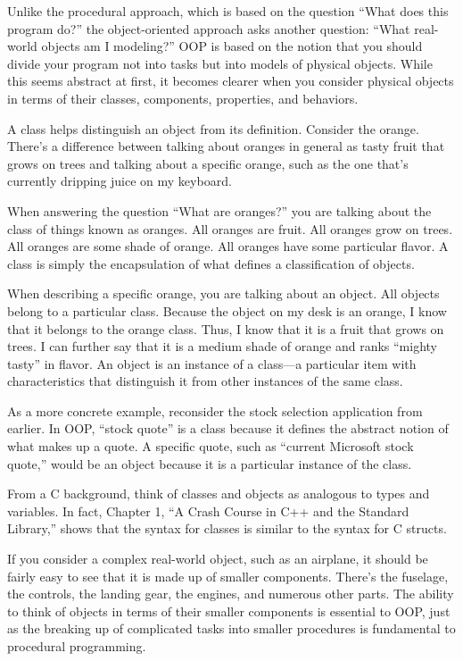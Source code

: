 
Unlike the procedural approach, which is based on the question “What does this program do?” the object-oriented approach asks another question: “What real-world objects am I modeling?” OOP is based on the notion that you should divide your program not into tasks but into models of physical objects. While this seems abstract at first, it becomes clearer when you consider physical objects in terms of their classes, components, properties, and behaviors.


A class helps distinguish an object from its definition. Consider the orange. There’s a difference between talking about oranges in general as tasty fruit that grows on trees and talking about a specific orange, such as the one that’s currently dripping juice on my keyboard.

When answering the question “What are oranges?” you are talking about the class of things known as oranges. All oranges are fruit. All oranges grow on trees. All oranges are some shade of orange. All oranges have some particular flavor. A class is simply the encapsulation of what defines a classification of objects.

When describing a specific orange, you are talking about an object. All objects belong to a particular class. Because the object on my desk is an orange, I know that it belongs to the orange class. Thus, I know that it is a fruit that grows on trees. I can further say that it is a medium shade of orange and ranks “mighty tasty” in flavor. An object is an instance of a class—a particular item with characteristics that distinguish it from other instances of the same class.

As a more concrete example, reconsider the stock selection application from earlier. In OOP, “stock quote” is a class because it defines the abstract notion of what makes up a quote. A specific quote, such as “current Microsoft stock quote,” would be an object because it is a particular instance of the class.

From a C background, think of classes and objects as analogous to types and variables. In fact, Chapter 1, “A Crash Course in C++ and the Standard Library,” shows that the syntax for classes is similar to the syntax for C structs.


If you consider a complex real-world object, such as an airplane, it should be fairly easy to see that it is made up of smaller components. There’s the fuselage, the controls, the landing gear, the engines, and numerous other parts. The ability to think of objects in terms of their smaller components is essential to OOP, just as the breaking up of complicated tasks into smaller procedures is fundamental to procedural programming.

